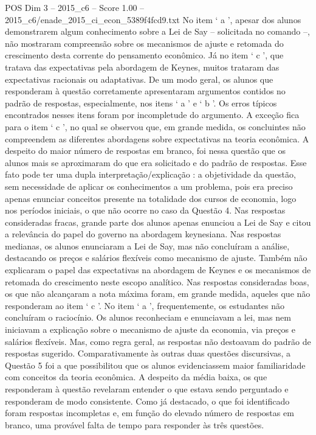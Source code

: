 \begin{textsample}{POS Dim 3 – 2015\_c6 – Score 1.00 – 2015\_c6/enade\_2015\_ci\_econ\_5389f4fcd9.txt}
No item ‘ a ’, apesar dos alunos demonstrarem algum conhecimento sobre a Lei de Say – solicitada no comando –, não mostraram compreensão sobre os mecanismos de ajuste e retomada do crescimento desta corrente do pensamento econômico.
Já no item ‘ c ’, que tratava das expectativas pela abordagem de Keynes, muitos trataram das expectativas racionais ou adaptativas.
De um modo geral, os alunos que responderam à questão corretamente apresentaram argumentos contidos no padrão de respostas, especialmente, nos itens ‘ a ’ e ‘ b ’.
Os erros típicos encontrados nesses itens foram por incompletude do argumento.
A exceção fica para o item ‘ c ’, no qual se observou que, em grande medida, os concluintes não compreendem as diferentes abordagens sobre expectativas na teoria econômica.
A despeito do maior número de respostas em branco, foi nessa questão que os alunos mais se aproximaram do que era solicitado e do padrão de respostas.
Esse fato pode ter uma dupla interpretação/explicação : a objetividade da questão, sem necessidade de aplicar os conhecimentos a um problema, pois era preciso apenas enunciar conceitos presente na totalidade dos cursos de economia, logo nos períodos iniciais, o que não ocorre no caso da Questão 4.
Nas respostas consideradas fracas, grande parte dos alunos apenas enunciou a Lei de Say e citou a relevância do papel do governo na abordagem keynesiana.
Nas respostas medianas, os alunos enunciaram a Lei de Say, mas não concluíram a análise, destacando os preços e salários flexíveis como mecanismo de ajuste.
Também não explicaram o papel das expectativas na abordagem de Keynes e os mecanismos de retomada do crescimento neste escopo analítico.
Nas respostas consideradas boas, os que não alcançaram a nota máxima foram, em grande medida, aqueles que não responderam ao item ‘ c ’.
No item ‘ a ’, frequentemente, os estudantes não concluíram o raciocínio.
Os alunos reconheciam e enunciavam a lei, mas nem iniciavam a explicação sobre o mecanismo de ajuste da economia, via preços e salários flexíveis.
Mas, como regra geral, as respostas não destoavam do padrão de respostas sugerido.
Comparativamente às outras duas questões discursivas, a Questão 5 foi a que possibilitou que os alunos evidenciassem maior familiaridade com conceitos da teoria econômica.
A despeito da média baixa, os que responderam à questão revelaram entender o que estava sendo perguntado e responderam de modo consistente.
Como já destacado, o que foi identificado foram respostas incompletas e, em função do elevado número de respostas em branco, uma provável falta de tempo para responder às três questões.

\end{textsample}
